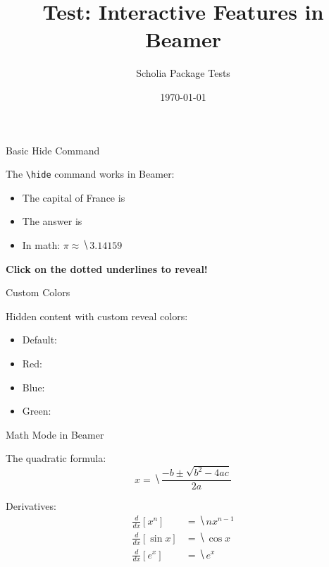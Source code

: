 \documentclass{beamer}
\title{Test: Interactive Features in Beamer}
\author{Scholia Package Tests}
\date{\today}
\begin{document}
\begin{frame}
  \titlepage
\end{frame}

\begin{frame}{Basic Hide Command}

The \texttt{\textbackslash hide} command works in Beamer:

\begin{itemize}
  \item The capital of France is 
  \item The answer is 
  \item In math: $\pi \approx \hide{3.14159}$
\end{itemize}

\textbf{Click on the dotted underlines to reveal!}

\end{frame}

\begin{frame}{Custom Colors}

Hidden content with custom reveal colors:

\begin{itemize}
  \item Default: 
  \item Red: 
  \item Blue: 
  \item Green: 
\end{itemize}

\end{frame}

\begin{frame}{Math Mode in Beamer}

The quadratic formula:
\[
  x = \hide{\frac{-b \pm \sqrt{b^2 - 4ac}}{2a}}
\]

Derivatives:
\begin{align*}
  \frac{d}{dx}[x^n] &= \hide{nx^{n-1}} \\
  \frac{d}{dx}[\sin x] &= \hide{\cos x} \\
  \frac{d}{dx}[e^x] &= \hide{e^x}
\end{align*}

\end{frame}
\end{document}
